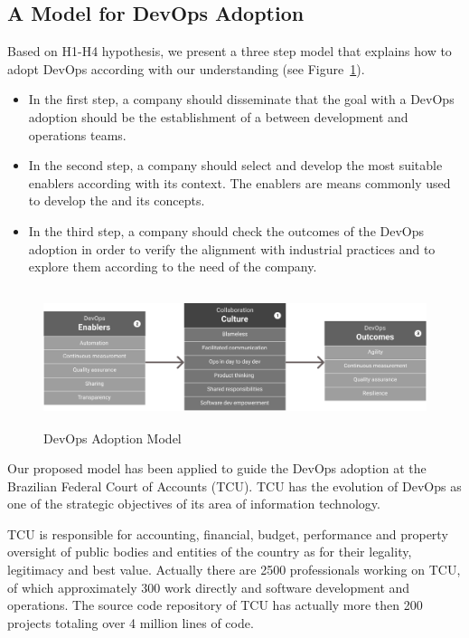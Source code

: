 \subsection{A Model for DevOps Adoption}\label{sec:case_study}

Based on H1-H4 hypothesis, we present a three step model that
explains how to adopt DevOps according with our understanding
(see Figure~\ref{fig2}).

\begin{itemize}
\item In the first step, a company should
disseminate that the goal with a DevOps adoption should be
the establishment of a  between
development and operations teams.

\item In the second step, a company should select and develop
the most suitable enablers according with its context. The enablers
are means commonly used to develop the 
and its concepts.

\item In the third step, a company should check the outcomes of the
DevOps adoption in order to verify the alignment with
industrial practices and to explore them according to the
need of the company.
\end{itemize}

\begin{figure}[t]
  \centering
    \includegraphics[width=14.26cm,height=4cm,natwidth=1116,natheight=313]{model.png}
    \caption{DevOps Adoption Model}
    \label{fig2}
\end{figure}


Our proposed model has been applied to guide the DevOps adoption at the Brazilian Federal Court of
Accounts (TCU). TCU has the
evolution of DevOps as one of the strategic objectives of its area of
information technology.

TCU is responsible for accounting, financial, budget, performance and property
oversight of public bodies and entities of the country as for their legality,
legitimacy and best value. Actually there are 2500 professionals working on TCU,
of which approximately 300 work directly and software development and operations.
The source code repository of TCU has actually more then 200 projects totaling
over 4 million lines of code.

